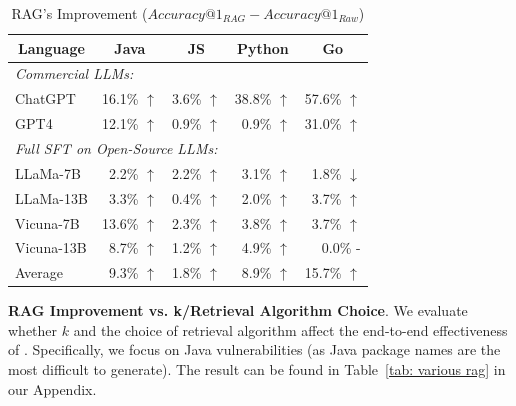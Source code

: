 \begin{table}[t]
\centering
\small
\caption{RAG's Improvement ($Accuracy@1_{RAG} - Accuracy@1_{Raw}$)}
\label{tab: rag improvement}
\begin{tabular}{lrrrr}
\toprule
\multicolumn{1}{c}{\multirow{1}{*}{Language}} & \multicolumn{1}{c}{Java}                        &        \multicolumn{1}{c}{JS}                 &          \multicolumn{1}{c}{Python}               &     \multicolumn{1}{c}{Go}                    \\
\midrule
\multicolumn{3}{l}{\textit{Commercial LLMs:}}                          &                         &                         \\
ChatGPT                                       & 16.1\% $\uparrow$       & 3.6\% $\uparrow$       & 38.8\% $\uparrow$       & 57.6\% $\uparrow$                \\
GPT4                                          & 12.1\% $\uparrow$       &    0.9\% $\uparrow$                     &      0.9\% $\uparrow$                   &        31.0\% $\uparrow$                 \\ 
\midrule
\multicolumn{5}{l}{\textit{Full SFT on Open-Source LLMs:}}                                                                          \\
LLaMa-7B                                      & 2.2\% $\uparrow$       & 2.2\% $\uparrow$       & 3.1\% $\uparrow$       & 1.8\% $\downarrow$     \\
LLaMa-13B                                     & 3.3\% $\uparrow$       & 0.4\% $\uparrow$       & 2.0\% $\uparrow$       & 3.7\% $\uparrow$       \\
Vicuna-7B                                     & 13.6\% $\uparrow$      & 2.3\% $\uparrow$       & 3.8\% $\uparrow$       & 3.7\% $\uparrow$       \\
Vicuna-13B                                    & 8.7\% $\uparrow$      & 1.2\% $\uparrow$       & 4.9\% $\uparrow$       & 0.0\% -                \\
\midrule
Average                                      & 9.3\% $\uparrow$      & 1.8\% $\uparrow$       & 8.9\% $\uparrow$       & 15.7\% $\uparrow$         \\
\bottomrule
\end{tabular}
\vspace{-0.2cm}
\end{table}



\noindent \textbf{RAG Improvement vs. k/Retrieval Algorithm Choice}. We evaluate whether $k$ and the choice of retrieval algorithm affect the end-to-end effectiveness of \detector{}. Specifically, we focus on Java vulnerabilities (as Java package names are the most difficult to generate). 
The result can be found in Table~\ref{tab: various rag} in our Appendix.

